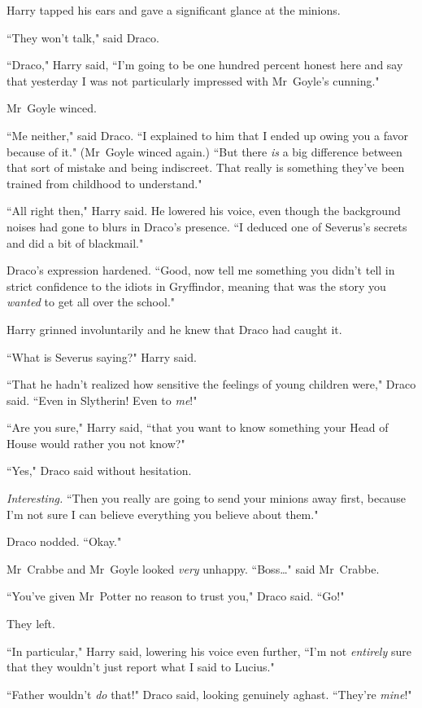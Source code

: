 Harry tapped his ears and gave a significant glance at the minions.

``They won't talk," said Draco.

``Draco," Harry said, ``I'm going to be one hundred percent honest here and say that yesterday I was not particularly impressed with Mr~Goyle's cunning."

Mr~Goyle winced.

``Me neither," said Draco. ``I explained to him that I ended up owing you a favor because of it." (Mr~Goyle winced again.) ``But there \emph{is} a big difference between that sort of mistake and being indiscreet. That really is something they've been trained from childhood to understand."

``All right then," Harry said. He lowered his voice, even though the background noises had gone to blurs in Draco's presence. ``I deduced one of Severus's secrets and did a bit of blackmail."

Draco's expression hardened. ``Good, now tell me something you didn't tell in strict confidence to the idiots in Gryffindor, meaning that was the story you \emph{wanted} to get all over the school."

Harry grinned involuntarily and he knew that Draco had caught it.

``What is Severus saying?" Harry said.

``That he hadn't realized how sensitive the feelings of young children were," Draco said. ``Even in Slytherin! Even to \emph{me}!"

``Are you sure," Harry said, ``that you want to know something your Head of House would rather you not know?"

``Yes," Draco said without hesitation.

\emph{Interesting.} ``Then you really are going to send your minions away first, because I'm not sure I can believe everything you believe about them."

Draco nodded. ``Okay."

Mr~Crabbe and Mr~Goyle looked \emph{very} unhappy. ``Boss{\ldots}" said Mr~Crabbe.

``You've given Mr~Potter no reason to trust you," Draco said. ``Go!"

They left.

``In particular," Harry said, lowering his voice even further, ``I'm not \emph{entirely} sure that they wouldn't just report what I said to Lucius."

``Father wouldn't \emph{do} that!" Draco said, looking genuinely aghast. ``They're \emph{mine}!"

